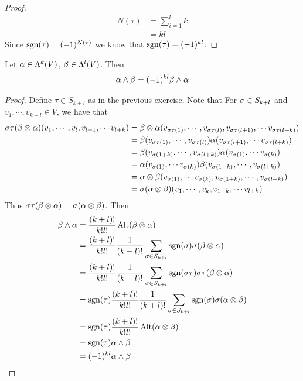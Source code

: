 \documentclass{book}
\begin{document}
	\begin{proof}
		\begin{align*}
			N(\tau) 
			& = \sum_{i = 1}^l k \\
			& = kl
		\end{align*}
		Since $\operatorname{sgn} (\tau) = (-1)^{N(\tau)}$ we know that  $\operatorname{sgn}(\tau) = (-1)^{kl}$.
	\end{proof}

	
	\begin{ex}
		Let $\alpha \in \Lambda^k(V)$, $\beta \in \Lambda^l(V)$. Then $$\alpha \wedge \beta = (-1)^{kl}\beta \wedge \alpha$$
	\end{ex}

	\begin{proof}
		Define $\tau \in S_{k+l}$ as in the previous exercise. Note that For $\sigma \in S_{k+l}$ and $v_1, \cdots, v_{k +l} \in V$, we have that 
		\begin{align*}
			\sigma \tau (\beta \otimes \alpha)(v_1, \cdots, v_l, v_{l+1}, \cdots v_{l+k}) 
			& = \beta \otimes \alpha(v_{\sigma \tau(1)}, \cdots, v_{\sigma \tau(l)}, v_{\sigma \tau(l+1)}, \cdots v_{\sigma \tau(l+k)}) \\
			& = \beta(v_{\sigma \tau(1)}, \cdots, v_{\sigma \tau(l)}) \alpha(v_{\sigma \tau(l+1)}, \cdots v_{\sigma \tau(l+k)}) \\
			& = \beta(v_{\sigma (1+k)}, \cdots, v_{\sigma (l+k)}) \alpha(v_{\sigma (1)}, \cdots v_{\sigma (k)})\\ 
			& = \alpha(v_{\sigma (1)}, \cdots v_{\sigma (k)}) \beta(v_{\sigma (1+k)}, \cdots, v_{\sigma (l+k)}) \\
			& = \alpha \otimes \beta (v_{\sigma (1)}, \cdots v_{\sigma (k)}, v_{\sigma (1+k)}, \cdots, v_{\sigma (l+k)}) \\
			& = \sigma (\alpha \otimes \beta) (v_1, \cdots, v_k, v_{1+k}, \cdots v_{l+k})
		\end{align*}
		Thus $\sigma \tau (\beta \otimes \alpha) = \sigma (\alpha \otimes \beta)$. Then 
		\begin{align*}
			\beta \wedge \alpha
			& = \frac{(k+l)!}{k!l!}\operatorname{Alt}(\beta \otimes \alpha) \\
			& =  \frac{(k+l)!}{k!l!} \frac{1}{(k+l)!} \sum_{\sigma \in S_{k+l}} \operatorname{sgn}(\sigma) \sigma (\beta \otimes \alpha) \\
			& = \frac{(k+l)!}{k!l!} \frac{1}{(k+l)!} \sum_{\sigma \in S_{k+l}} \operatorname{sgn}(\sigma \tau) \sigma \tau (\beta \otimes \alpha) \\
			& = \operatorname{sgn}(\tau)\frac{(k+l)!}{k!l!} \frac{1}{(k+l)!} \sum_{\sigma \in S_{k+l}} \operatorname{sgn}(\sigma) \sigma (\alpha \otimes \beta) \\
			& = \operatorname{sgn}(\tau)\frac{(k+l)!}{k!l!}  \operatorname{Alt}(\alpha \otimes \beta) \\
			& = \operatorname{sgn}(\tau) \alpha \wedge \beta \\
			& = (-1)^{kl} \alpha \wedge \beta
		\end{align*}
	 
	\end{proof}
\end{document}
